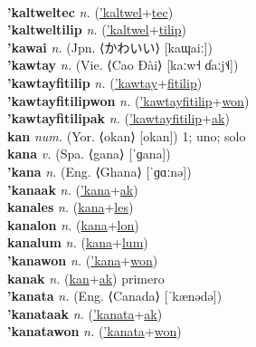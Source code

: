  \label{'kaltwelkwelyot} \\
\textbf{'kaltweltec} \textit{n.} (\hyperref['kaltwel]{'kaltwel}+\hyperref[tec]{tec})
 \label{'kaltweltec} \\
\textbf{'kaltweltilip} \textit{n.} (\hyperref['kaltwel]{'kaltwel}+\hyperref[tilip]{tilip})
 \label{'kaltweltilip} \\
\textbf{'kawai} \textit{n.} (Jpn. ⟨かわいい⟩ [kaɰaiː])
 \label{'kawai} \\
\textbf{'kawtay} \textit{n.} (Vie. ⟨Cao Đài⟩ [kaːw˧ ɗaːj˦˨])
 \label{'kawtay} \\
\textbf{'kawtayfitilip} \textit{n.} (\hyperref['kawtay]{'kawtay}+\hyperref[fitilip]{fitilip})
 \label{'kawtayfitilip} \\
\textbf{'kawtayfitilipwon} \textit{n.} (\hyperref['kawtayfitilip]{'kawtayfitilip}+\hyperref[won]{won})
 \label{'kawtayfitilipwon} \\
\textbf{'kawtayfitilipak} \textit{n.} (\hyperref['kawtayfitilip]{'kawtayfitilip}+\hyperref[ak]{ak})
 \label{'kawtayfitilipak} \\
\textbf{kan} \textit{num.} (Yor. ⟨okan⟩ [okan])
1; uno; solo \label{kan} \\
\textbf{kana} \textit{v.} (Spa. ⟨gana⟩ [ˈɡana])
 \label{kana} \\
\textbf{'kana} \textit{n.} (Eng. ⟨Ghana⟩ [ˈɡɑːnə])
 \label{'kana} \\
\textbf{'kanaak} \textit{n.} (\hyperref['kana]{'kana}+\hyperref[ak]{ak})
 \label{'kanaak} \\
\textbf{kanales} \textit{n.} (\hyperref[kana]{kana}+\hyperref[les]{les})
 \label{kanales} \\
\textbf{kanalon} \textit{n.} (\hyperref[kana]{kana}+\hyperref[lon]{lon})
 \label{kanalon} \\
\textbf{kanalum} \textit{n.} (\hyperref[kana]{kana}+\hyperref[lum]{lum})
 \label{kanalum} \\
\textbf{'kanawon} \textit{n.} (\hyperref['kana]{'kana}+\hyperref[won]{won})
 \label{'kanawon} \\
\textbf{kanak} \textit{n.} (\hyperref[kan]{kan}+\hyperref[ak]{ak})
primero \label{kanak} \\
\textbf{'kanata} \textit{n.} (Eng. ⟨Canada⟩ [ˈkænədə])
 \label{'kanata} \\
\textbf{'kanataak} \textit{n.} (\hyperref['kanata]{'kanata}+\hyperref[ak]{ak})
 \label{'kanataak} \\
\textbf{'kanatawon} \textit{n.} (\hyperref['kanata]{'kanata}+\hyperref[won]{won})
 \label{'kanatawon} \\
